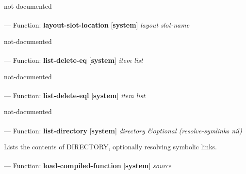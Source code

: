 \begin{adjustwidth}{5em}{5em}
not-documented
\end{adjustwidth}

\paragraph{}
\label{SYSTEM:LAYOUT-SLOT-LOCATION}
--- Function: \textbf{layout-slot-location} [\textbf{system}] \textit{layout slot-name}

\begin{adjustwidth}{5em}{5em}
not-documented
\end{adjustwidth}

\paragraph{}
\label{SYSTEM:LIST-DELETE-EQ}
--- Function: \textbf{list-delete-eq} [\textbf{system}] \textit{item list}

\begin{adjustwidth}{5em}{5em}
not-documented
\end{adjustwidth}

\paragraph{}
\label{SYSTEM:LIST-DELETE-EQL}
--- Function: \textbf{list-delete-eql} [\textbf{system}] \textit{item list}

\begin{adjustwidth}{5em}{5em}
not-documented
\end{adjustwidth}

\paragraph{}
\label{SYSTEM:LIST-DIRECTORY}
--- Function: \textbf{list-directory} [\textbf{system}] \textit{directory \&optional (resolve-symlinks nil)}

\begin{adjustwidth}{5em}{5em}
Lists the contents of DIRECTORY, optionally resolving symbolic links.
\end{adjustwidth}

\paragraph{}
\label{SYSTEM:LOAD-COMPILED-FUNCTION}
--- Function: \textbf{load-compiled-function} [\textbf{system}] \textit{source}


